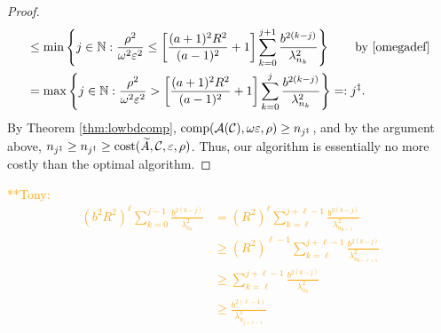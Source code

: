 \documentclass[graybox,footinfo]{svmult}
\newcommand{\tonynote}[1]{ {\textcolor{orange}  {\mbox{**Tony:} #1}}}
\begin{document}
\begin{proof}
\begin{align*}
&\le \min \left \{j \in {\mathbb{N}} : \frac{\rho^2}{\omega^2 \varepsilon^2} \le \left[\frac{(a+1)^{2} R^2 }{(a-1)^2} + 1\right] \sum_{k=0}^{j+1} \frac{b^{2(k-j)}}{\lambda_{n_{k}}^2} \right\} \qquad \text{by \eqref{omegadef} } \\
&= \max \left \{j \in {\mathbb{N}} : \frac{\rho^2}{\omega^2 \varepsilon^2} > \left[\frac{(a+1)^{2} R^2 }{(a-1)^2} + 1\right] \sum_{k=0}^{j} \frac{b^{2(k-j)}}{\lambda_{n_{k}}^2} \right\} =:j^{\ddagger}.
\end{align*}
By Theorem \ref{thm:lowbdcomp}, $\textup{comp}({\mathcal{A}}({\mathcal{C}}),\omega\varepsilon,\rho) \ge n_{j^{\ddagger}}$, and by the argument above, $n_{j^{\ddagger}} \ge n_{j^\dagger} \ge \textup{cost}(\widetilde{A},{\mathcal{C}},\varepsilon,\rho)$.  Thus, our algorithm is essentially no more costly than the optimal algorithm.
\end{proof}
\tonynote{
\begin{align*}
(b^2R^2)^\ell \sum_{k=0}^{j-1} \frac{b^{2(k-j)}}{\lambda_{n_{k}}^2} & = (R^2)^\ell\sum_{k=\ell}^{j+\ell-1} \frac{b^{2(k-j)}}{\lambda_{n_{k-\ell}}^2} \\
& \geq (R^2)^{\ell-1}\sum_{k=\ell}^{j+\ell-1} \frac{b^{2(k-j)}}{\lambda_{n_{k-\ell+1}}^2} \\
& \geq \sum_{k=\ell}^{j+\ell-1} \frac{b^{2(k-j)}}{\lambda_{n_{k}}^2} \\
& \geq \frac{b^{2(\ell-1)}}{\lambda_{n_{j+\ell-1}}^2}
\end{align*}
}
\end{document}
